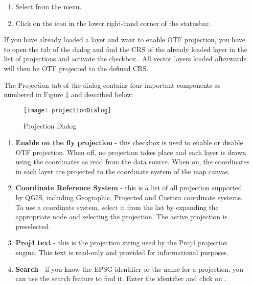 \begin{enumerate}
\item Select  from the
 menu.
\item Click on the  icon in the
lower right-hand corner of the
statusbar.
\end{enumerate}

If you have already loaded a layer and want to enable OTF projection, you
have to open the  tab of the 
dialog and find the CRS of the already loaded layer in the list of
projections and activate the 
checkbox.. All vector layers loaded afterwards will then be OTF projected to
the defined CRS.

The Projection tab of the  dialog contains four
important components as numbered in Figure \ref{fig:projections} and described below.

\begin{figure}[ht]
   \begin{center}
   \caption{Projection Dialog \nixcaption}\label{fig:projections}\smallskip
   \texttt{[image: projectionDialog]}
\end{center}  
\end{figure}

\begin{enumerate}
\item \textbf{Enable on the fly projection} - this checkbox is used
to enable or disable OTF
projection. When off, no projection takes place and each layer
is drawn using the coordinates as read from the data source. When on, the
coordinates in each layer are projected to the coordinate system of the map
canvas.
\item \textbf{Coordinate Reference System} - this is a list of all projection
supported by QGIS, including Geographic, Projected and Custom coordinate
systems. To use a coordinate system, select it from the list by expanding the
appropriate node and selecting the projection. The active projection is
preselected.
\item \textbf{Proj4 text} - this is the projection string used by the Proj4 projection
engine. This text is read-only and provided for informational purposes.
\item \textbf{Search} - if you know the EPSG identifier or the name 
for a projection, you can use the search feature to find it. Enter the 
identifier and click on .
\end{enumerate}

